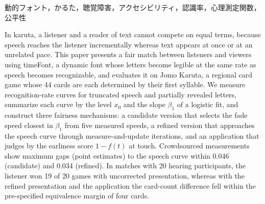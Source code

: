 \begin{abstract}
かるたでは，読み手の声が先頭から少しずつ届き，聞く人は第一音のうちに札を絞り込む．
文字を見て札を当てる人が競うには，文字が見えてくる速さを声が分かっていく速さに合わせる必要がある．
本稿では，音が分かっていく速さに合わせて文字が見えてくる速さを設計した動的フォント timeFont を用い，
聞く人と見る人が公平に早押しを競えるかるたの対戦を構成し，群馬県の郷土かるたである上毛かるた（44 枚，すべて一字決まり）で評価する．
公平性を音声と文字の認識率の曲線が各時刻で一致することと定義し，提示を途中で打ち切ったときの曲線を実測して，ロジスティック曲線のレベル $x_0$ と傾き $\beta_1$ で要約する．
公平にする仕組みとして，速さを 5 段階に変えて実測したフェードの候補から札ごとに $\beta_1$ の最も近い段階を選択する方法（候補版），
候補版から内挿した提示を測定と更新の反復で音声の曲線に近づける方法（精密版），
および押した時刻の早押し度 $1-f(t)$ で勝敗を判定するアプリの 3 つを構成した．
クラウドソーシングによる測定から，音声との認識率の差の最大は点推定で，候補版では全札で 0.046 以内，精密版では反復 2 回で 0.034 以内であった．
聴者 20 名（10 組）による対戦実験では，補正のない提示で聞く役が 20 試合中 19 試合に勝ったのに対し，精密版の提示とアプリでは取り札数の差が同等とみなす範囲の内側に収まり，公平感の評定も中立に近い値になった．
\end{abstract}

\begin{jkeyword}
動的フォント，かるた，聴覚障害，アクセシビリティ，認識率，心理測定関数，公平性
\end{jkeyword}

\begin{eabstract}
In karuta, a listener and a reader of text cannot compete on equal terms, because speech reaches the listener incrementally whereas text appears at once or at an unrelated pace.
This paper presents a fair match between listeners and viewers using timeFont, a dynamic font whose letters become legible at the same rate as speech becomes recognizable, and evaluates it on Jomo Karuta, a regional card game whose 44 cards are each determined by their first syllable.
We measure recognition-rate curves for truncated speech and partially revealed letters, summarize each curve by the level $x_0$ and the slope $\beta_1$ of a logistic fit, and construct three fairness mechanisms: a candidate version that selects the fade speed closest in $\beta_1$ from five measured speeds, a refined version that approaches the speech curve through measure-and-update iterations, and an application that judges by the earliness score $1-f(t)$ at touch.
Crowdsourced measurements show maximum gaps (point estimates) to the speech curve within 0.046 (candidate) and 0.034 (refined). In matches with 20 hearing participants, the listener won 19 of 20 games with uncorrected presentation, whereas with the refined presentation and the application the card-count difference fell within the pre-specified equivalence margin of four cards.
\end{eabstract}

